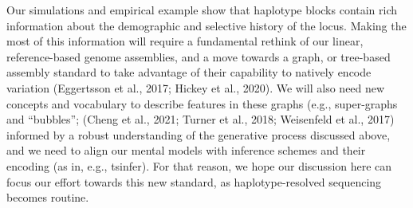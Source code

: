 \documentclass[twocolumn]{bmcart}%
\begin{document}
Our simulations and empirical example show that haplotype blocks contain rich information about the demographic and selective history of the locus. Making the most of this information will require a fundamental rethink of our linear, reference-based genome assemblies, and a move towards a graph, or tree-based assembly standard to take advantage of their capability to natively encode variation (Eggertsson et al., 2017; Hickey et al., 2020). We will also need new concepts and vocabulary to describe features in these graphs (e.g., super-graphs and “bubbles”; (Cheng et al., 2021; Turner et al., 2018; Weisenfeld et al., 2017) informed by a robust understanding of the generative process discussed above, and we need to align our mental models with inference schemes and their encoding (as in, e.g., tsinfer). For that reason, we hope our discussion here can focus our effort towards this new standard, as haplotype-resolved sequencing becomes routine.
\end{document}

